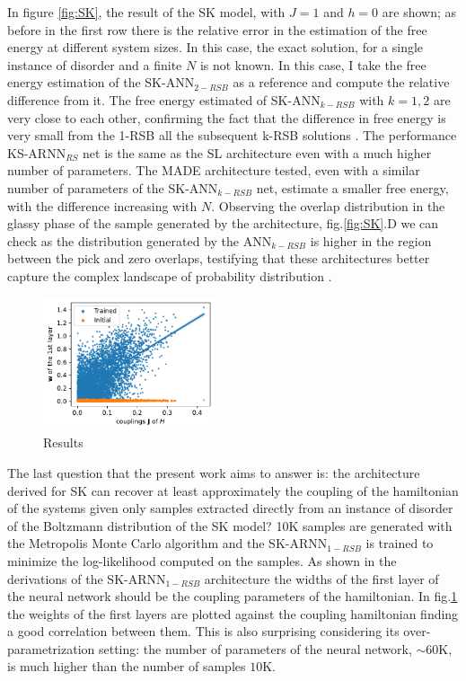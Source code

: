 \documentclass[aps,physrev,10pt,floatfix,reprint]{revtex4-2}
\begin{document}
In figure \ref{fig:SK}, the result of the SK model, with $J=1$ and $h=0$ are shown; as before in the first row there is the relative error in the estimation of the free energy at different system sizes. In this case, the exact solution, for a single instance of disorder and a finite $N$ is not known. In this case, I take the free energy estimation of the SK-ANN$_{2-RSB}$ as a reference and compute the relative difference from it. The free energy estimated of SK-ANN$_{k-RSB}$ with $k=1,2$ are very close to each other, confirming the fact that the difference in free energy is very small from the 1-RSB all the subsequent k-RSB solutions \cite{Parisi_1980}. The performance KS-ARNN$_{RS}$ net is the same as the SL architecture even with a much higher number of parameters. The MADE architecture tested, even with a similar number of parameters of the SK-ANN$_{k-RSB}$ net, estimate a smaller free energy, with the difference increasing with $N$. Observing the overlap distribution in the glassy phase of the sample generated by the architecture, fig.\ref{fig:SK}.D we can check as the distribution generated by the ANN$_{k-RSB}$ is higher in the region between the pick and zero overlaps, testifying that these architectures better capture the complex landscape of probability distribution \cite{PhysRevLett.51.1206}.

\begin{figure}[]
    \centering 
    \includegraphics[width=0.45\textwidth]{img/MC_img.pdf}
    \caption{Results}
    \label{fig:SK_MC}
\end{figure}

The last question that the present work aims to answer is: the architecture derived for SK can recover at least approximately the coupling of the hamiltonian of the systems given only samples extracted directly from an instance of disorder of the Boltzmann distribution of the SK model? 10K samples are generated with the Metropolis Monte Carlo algorithm and the SK-ARNN$_{1-RSB}$ is trained to minimize the log-likelihood computed on the samples. As shown in the derivations of the SK-ARNN$_{1-RSB}$ architecture the widths of the first layer of the neural network should be the coupling parameters of the hamiltonian. In fig.\ref{fig:SK_MC} the weights of the first layers are plotted against the coupling hamiltonian finding a good correlation between them. This is also surprising considering its over-parametrization setting: the number of parameters of the neural network, $\sim 60$K, is much higher than the number of samples $10$K.
\end{document}
